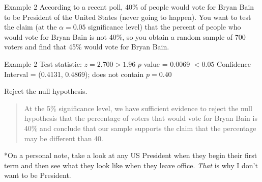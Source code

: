 \documentclass[t]{beamer}
\begin{document}
\begin{frame}{Example 2}
According to a recent poll, 40\% of people would vote for Bryan Bain to be President of the United States (never going to happen). You want to test the claim (at the $\alpha = 0.05$ significance level) that the percent of people who would vote for Bryan Bain is not 40\%, so you obtain a random sample of 700 voters and find that 45\% would vote for Bryan Bain.	\newline\\

 \newline
{}
\end{frame}

\begin{frame}{Example 2}
Test statistic: $z = 2.700 > 1.96$	\newline
$p$-value = 0.0069 $< 0.05$	\newline
Confidence Interval = (0.4131, 0.4869); does not contain $p = 0.40$	\newline\\	\pause

Reject the null hypothesis.	\newline\\	\pause

\begin{quote}
At the 5\% significance level, we have sufficient evidence to reject the null hypothesis that the percentage of voters that would vote for Bryan Bain is 40\% and conclude that our sample supports the claim that the percentage may be different than 40.
\end{quote}
\pause

*On a personal note, take a look at any US President when they begin their first term and then see what they look like when they leave office. \emph{That} is why I don't want to be President.
\end{frame}
\end{document}
